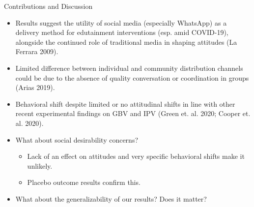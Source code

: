 \documentclass[10pt]{beamer}
\begin{document}
\begin{frame}{Contributions and Discussion}
\begin{itemize}
    \item Results suggest the utility of social media (especially WhatsApp) as a delivery method for edutainment interventions (esp. amid COVID-19), alongside the continued role of traditional media in shaping attitudes (La Ferrara 2009).  
    \item Limited difference between individual and community distribution channels could be due to the absence of quality conversation or coordination in groups (Arias 2019).
    \vspace{2mm}
    \item Behavioral shift despite limited or no attitudinal shifts in line with other recent experimental findings on GBV and IPV (Green et. al. 2020; Cooper et. al. 2020).
   \item What about social desirability concerns?
   \begin{itemize}
       \item Lack of an effect on attitudes and very specific behavioral shifts make it unlikely.
       \item Placebo outcome results confirm this.
   \end{itemize}
   \item What about the generalizability of our results? Does it matter?
\end{itemize}
\end{frame}
\end{document}

